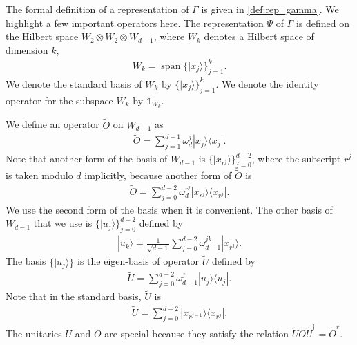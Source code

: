 \documentclass[11pt,letterpaper]{article}
\newcommand{\ket}[1]{|#1\rangle}
\newcommand{\ketbra}[2]{|#1\rangle\langle#2|}
\newcommand{\x}{\otimes}
\newcommand{\ct}{^{\dagger}}
\DeclareMathOperator{\spn}{span}
\newcommand{\1}{\mathbb{1}}
\newcommand{\tO}{\tilde{O}}
\newcommand{\tU}{\tilde{U}}
\theoremstyle{definition}
\begin{document}
The formal definition of a representation of $\Gamma$ is given in \cref{def:rep_gamma}. 
We highlight a few important operators here.
The representation $\Psi$ of $\Gamma$ is defined on the Hilbert space
$W_2 \x W_2 \x W_{d-1}$,
where $W_k$ denotes a Hilbert space of
dimension $k$,
\begin{align}
    \label{eq:basis}
    W_k = \spn\{ \ket{x_j} \}_{j=1}^k.
\end{align}
We denote the standard basis of $W_k$ by $\{\ket{x_j}\}_{j=1}^{k}$.
We denote the identity operator for the subspace $W_k$ by $\1_{W_k}$.


We define an operator $\tO$ on $W_{d-1}$ as
\begin{align*}
    \tO = \sum_{j=1}^{d-1} \omega_d^j \ketbra{x_j}{x_j}.
\end{align*}
Note that another form of the basis of $W_{d-1}$ is $\{\ket{x_{r^j}}\}_{j=0}^{d-2}$, 
where the subscript $r^j$ is taken modulo $d$ implicitly,
because another form of $\tO$ is 
\begin{align}
    \label{eq:O}
    \tO = \sum_{j=0}^{d-2} \omega_d^{r^j} \ketbra{x_{r^j}}{x_{r^j}}.
\end{align}
We use the second form of the basis when it is convenient.
The other basis of $W_{d-1}$ that we use is $\{ \ket{u_j} \}_{j=0}^{d-2}$ defined by
\begin{align*}
	\ket{u_k} = \frac{1}{\sqrt{d-1}} \sum_{j=0}^{d-2} \omega_{d-1}^{jk} \ket{x_{r^j}}.
\end{align*}
The basis $\{\ket{u_j}\}$ is the eigen-basis of operator $\tU$ defined by
\begin{align*}
    \tU = \sum_{j=0}^{d-2} \omega_{d-1}^j \ketbra{u_j}{u_j}.
\end{align*}
Note that in the standard basis, $\tU$ is
\begin{align}
    \label{eq:U}
    \tU = \sum_{j=0}^{d-2} \ketbra{x_{r^{j-1}}}{x_{r^j}}.
\end{align}
The unitaries $\tU$ and $\tO$ are special because 
they satisfy the relation $\tU \tO \tU\ct = \tO^r$.
\end{document}
